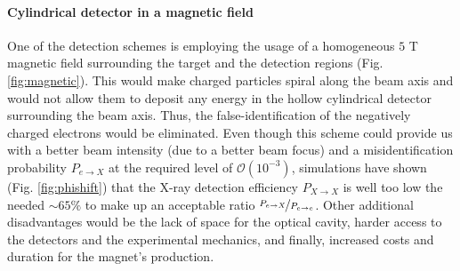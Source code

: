 \documentclass[12pt]{article}
\begin{document}
\paragraph{Cylindrical detector in a magnetic field}
One of the detection schemes is employing the usage of a homogeneous $5$ T magnetic field surrounding the target and the detection regions (Fig. \ref{fig:magnetic}). This would make charged particles spiral along the beam axis and would not allow them to deposit any energy in the hollow cylindrical detector surrounding the beam axis. Thus, the false-identification of the negatively charged electrons would be eliminated. Even though this scheme could provide us with a better beam intensity (due to a better beam focus) and a misidentification probability $P_{e{\rightarrow}X}$ at the required level of $\mathcal{O}(10^{-3})$, simulations have shown (Fig. \ref{fig:phishift}) that the X-ray detection efficiency $P_{X{\rightarrow}X}$ is well too low the needed $\sim 65 \%$ to make up an acceptable ratio $\nicefrac{P_{{e{\rightarrow}{X}}}}{P_{{e}\rightarrow{e}}}$. Other additional disadvantages would be the lack of space for the optical cavity, harder access to the detectors and the experimental mechanics, and finally, increased costs and duration for the magnet's production.  
\end{document}
